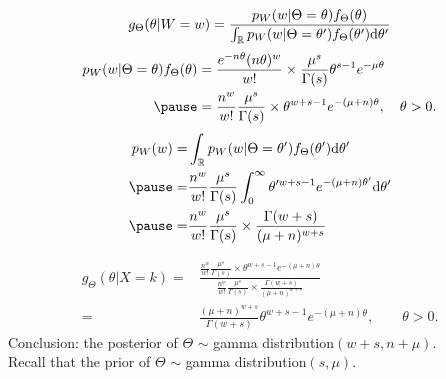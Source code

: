 \begin{frame}
  \[
 g_\Theta(\theta|W=w) = \frac{p_W(w|\Theta=\theta) f_\Theta(\theta)}{\int_{\mathbb{R}} p_W(w|\Theta=\theta') f_\Theta(\theta')\mathrm{d} \theta'}
  \]
  \vfill \pause
  \begin{align*}
  p_W(w|\Theta=\theta) f_\Theta(\theta)
  &= \frac{e^{-n\theta}(n\theta)^w}{w!}\times \frac{\mu^s}{\Gamma(s)}\theta^{s-1}e^{-\mu\theta}\\ \pause
  &= \frac{n^w}{w!} \frac{\mu^s}{\Gamma(s)}\times \theta^{w+s-1}e^{-(\mu+n)\theta}, \quad \theta>0.
  \end{align*}
\vfill \pause
  \begin{align*}
p_W(w) =& \int_\R p_W(w|\Theta=\theta') f_\Theta(\theta') \ud\theta'\\ \pause
=& \frac{n^w}{w!} \frac{\mu^s}{\Gamma(s)} \int_0^\infty \theta'^{w+s-1}e^{-(\mu+n)\theta'}\ud \theta'\\\pause
=& \frac{n^w}{w!} \frac{\mu^s}{\Gamma(s)} \times \frac{\Gamma(w+s)}{(\mu+n)^{w+s}}
\end{align*}
\end{frame}
\begin{frame}
 \begin{align*}
  g_\Theta(\theta|X=k) =& \frac{\displaystyle \frac{n^w}{w!} \frac{\mu^s}{\Gamma(s)} \times \theta^{w+s-1}e^{-(\mu+n)\theta}}{\displaystyle  \frac{n^w}{w!} \frac{\mu^s}{\Gamma(s)} \times \frac{\Gamma(w+s)}{(\mu+n)^{w+s} }} \\
  = & \frac{(\mu+n)^{w+s}}{\Gamma(w+s)} \theta^{w+s-1}e^{-(\mu+n)\theta}, \qquad \theta>0.
 \end{align*}
 \vfill
Conclusion: the posterior of $\Theta$ $\sim$ gamma distribution$(w+s, n+\mu)$. \\[1em]
Recall that the prior of $\Theta$ $\sim$ gamma distribution$(s, \mu)$.
\end{frame}
